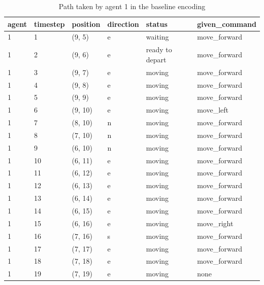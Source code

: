 \begin{table}[H]
  \centering
  \caption{Path taken by agent 1 in the baseline encoding}
  \label{tab:baseline1}
  \begin{tabular}{llllll}
    \toprule
    agent & timestep & position & direction & status & given\_command \\
    \midrule
1 & 1 & (9, 5) & e & waiting & move\_forward \\
1 & 2 & (9, 6) & e & ready to depart & move\_forward \\
1 & 3 & (9, 7) & e & moving & move\_forward \\
1 & 4 & (9, 8) & e & moving & move\_forward \\
1 & 5 & (9, 9) & e & moving & move\_forward \\
1 & 6 & (9, 10) & e & moving & move\_left \\
1 & 7 & (8, 10) & n & moving & move\_forward \\
1 & 8 & (7, 10) & n & moving & move\_forward \\
1 & 9 & (6, 10) & n & moving & move\_forward \\
1 & 10 & (6, 11) & e & moving & move\_forward \\
1 & 11 & (6, 12) & e & moving & move\_forward \\
1 & 12 & (6, 13) & e & moving & move\_forward \\
1 & 13 & (6, 14) & e & moving & move\_forward \\
1 & 14 & (6, 15) & e & moving & move\_forward \\
1 & 15 & (6, 16) & e & moving & move\_right \\
1 & 16 & (7, 16) & s & moving & move\_forward \\
1 & 17 & (7, 17) & e & moving & move\_forward \\
1 & 18 & (7, 18) & e & moving & move\_forward \\
1 & 19 & (7, 19) & e & moving &  none \\
    \bottomrule
  \end{tabular}
\end{table}